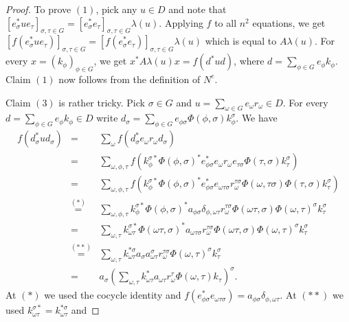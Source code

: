 \documentclass[12pt,reqno]{amsart}
\theoremstyle{definition}
\begin{document}
\begin{proof}
To prove $(1)$, pick any $u \in D$ and note that $[e_\sigma^\ast u e_\tau]_{\sigma,\tau \in G}
= [e_\sigma^\ast e_\tau]_{\sigma,\tau \in G} \lambda(u)$. Applying $f$ to all $n^2$ equations,
we get $[f(e_\sigma^\ast u e_\tau)]_{\sigma,\tau \in G}
= [f(e_\sigma^\ast e_\tau)]_{\sigma,\tau \in G} \lambda(u)$ which is equal to $A \lambda(u)$.
For every $x = (k_\phi)_{\phi \in G}$, we get $x^\ast A \lambda(u) x = f(d^\ast u d)$,
where $d = \sum_{\phi \in G} e_\phi k_\phi$. Claim $(1)$ now follows from the definition of $N^e$.

Claim $(3)$ is rather tricky. Pick $\sigma \in G$ and 
$u = \sum_{\omega \in G} e_\omega r_\omega \in D$. 
For every $d=\sum_{\phi \in G} e_\phi k_\phi \in D$ write 
$d_\sigma = \sum_{\phi \in G} e_{\phi \sigma} \Phi(\phi,\sigma) k_\phi^\sigma$. We have
\[
\begin{array}{ccl}
f(d_\sigma^\ast u d_\sigma)  & = & \sum_\omega f(d_\sigma^\ast e_\omega r_\omega d_\sigma) \\
& = & \sum_{\omega,\phi,\tau} f(k_\phi^{\sigma \ast} \Phi(\phi,\sigma)^\ast e_{\phi \sigma}^\ast
e_\omega r_\omega e_{\tau \sigma} \Phi(\tau, \sigma) k_\tau^\sigma) \\
& = & \sum_{\omega,\phi,\tau} f(k_\phi^{\sigma \ast} \Phi(\phi,\sigma)^\ast e_{\phi \sigma}^\ast
e_{\omega \tau \sigma} r_\omega^{\tau \sigma} \Phi(\omega,\tau \sigma) \Phi(\tau,\sigma) k_\tau^\sigma) \\
& \stackrel{(\ast)}{=} & \sum_{\omega,\phi,\tau} k_\phi^{\sigma \ast} \Phi(\phi,\sigma)^\ast a_{\phi \sigma}
\delta_{\phi,\omega \tau} r_\omega^{\tau \sigma} \Phi(\omega\tau, \sigma) \Phi(\omega,\tau)^\sigma
k_\tau^\sigma \\
& = & \sum_{\omega,\tau} k_{\omega \tau}^{\sigma \ast} \Phi(\omega \tau,\sigma)^\ast 
a_{\omega \tau \sigma} 
 r_\omega^{\tau \sigma} \Phi(\omega\tau, \sigma) \Phi(\omega,\tau)^\sigma
k_\tau^\sigma \\ 
&  \stackrel{(\ast\ast)}{=} & \sum_{\omega,\tau} k_{\omega \tau}^{\ast \sigma} 
a_\sigma a_{\omega \tau}^\sigma  r_\omega^{\tau \sigma}  \Phi(\omega,\tau)^\sigma
k_\tau^\sigma \\
& = & a_\sigma \left( \sum_{\omega,\tau} k_{\omega \tau}^{\ast} a_{\omega \tau}
 r_\omega^{\tau}  \Phi(\omega,\tau) k_\tau \right)^\sigma.
\end{array}
\]
At $(\ast)$ we used the cocycle identity and 
$f(e_{\phi \sigma}^\ast e_{\omega \tau \sigma})=a_{\phi \sigma} \delta_{\phi,\omega \tau}$.
At $(\ast\ast)$ we used $k_{\omega \tau}^{\sigma \ast} = k_{\omega \tau}^{\ast \sigma}$ and

\end{proof}
\end{document}
